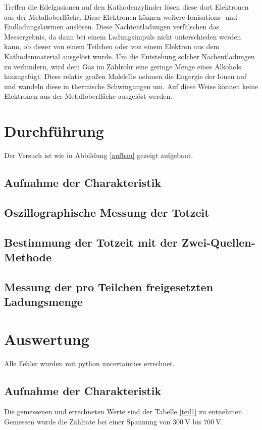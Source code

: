 \documentclass[11pt,ngerman,a4paper]{article}
\begin{document}
\noindent
Treffen die Edelgasionen auf den Kathodenzylinder lösen diese dort Elektronen aus der Metalloberfläche. Diese Elektronen können weitere Ionisations- und Endladungslawinen auslösen. Diese Nachtentladungen verfälschen das Messergebnis, da dann bei einem Ladungsimpuls nicht unterschieden werden kann, ob dieser von einem Teilchen oder von einem Elektron aus dem Kathodenmaterial ausgelöst wurde. Um die Entstehung solcher Nachentladungen zu verhindern, wird dem Gas im Zählrohr eine geringe Menge eines Alkohols hinzugefügt. Diese relativ großen Moleküle nehmen die Engergie der Ionen auf und wandeln diese in thermische Schwingungen um. Auf diese Weise können keine Elektronen aus der Metalloberfläche ausgelöst werden.
\section{Durchführung}
Der Versuch ist wie in Abbildung \ref{aufbau} gezeigt aufgebaut. 
\subsection{Aufnahme der Charakteristik}
\subsection{Oszillographische Messung der Totzeit}
\subsection{Bestimmung der Totzeit mit der Zwei-Quellen-Methode}
\subsection{Messung der pro Teilchen freigesetzten Ladungsmenge}
\section{Auswertung}
Alle Fehler wurden mit python uncertainties errechnet.
\subsection{Aufnahme der Charakteristik}
Die gemessenen und errechneten Werte sind der Tabelle \ref{teil1} zu entnehmen. Gemessen wurde die Zählrate bei einer Spannung von $\SI{300}{\volt}$ bis $\SI{700}{\volt}$.
\end{document}
